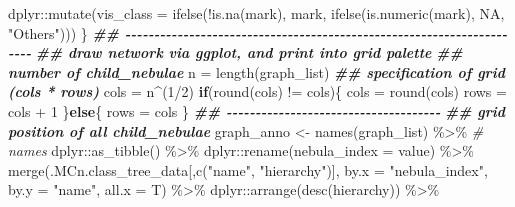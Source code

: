\documentclass[
]{article}
\newenvironment{Shaded}{\begin{snugshade}}{\end{snugshade}}
\newcommand{\AttributeTok}[1]{\textcolor[rgb]{0.77,0.63,0.00}{#1}}
\newcommand{\CommentTok}[1]{\textcolor[rgb]{0.56,0.35,0.01}{\textit{#1}}}
\newcommand{\ConstantTok}[1]{\textcolor[rgb]{0.00,0.00,0.00}{#1}}
\newcommand{\ControlFlowTok}[1]{\textcolor[rgb]{0.13,0.29,0.53}{\textbf{#1}}}
\newcommand{\DecValTok}[1]{\textcolor[rgb]{0.00,0.00,0.81}{#1}}
\newcommand{\DocumentationTok}[1]{\textcolor[rgb]{0.56,0.35,0.01}{\textbf{\textit{#1}}}}
\newcommand{\FunctionTok}[1]{\textcolor[rgb]{0.00,0.00,0.00}{#1}}
\newcommand{\NormalTok}[1]{#1}
\newcommand{\OtherTok}[1]{\textcolor[rgb]{0.56,0.35,0.01}{#1}}
\newcommand{\SpecialCharTok}[1]{\textcolor[rgb]{0.00,0.00,0.00}{#1}}
\newcommand{\StringTok}[1]{\textcolor[rgb]{0.31,0.60,0.02}{#1}}
\begin{document}
\begin{Shaded}
\begin{Highlighting}[]
\NormalTok{        dplyr}\SpecialCharTok{::}\FunctionTok{mutate}\NormalTok{(}\AttributeTok{vis\_class =} \FunctionTok{ifelse}\NormalTok{(}\SpecialCharTok{!}\FunctionTok{is.na}\NormalTok{(mark), mark,}
                                         \FunctionTok{ifelse}\NormalTok{(}\FunctionTok{is.numeric}\NormalTok{(mark), }\ConstantTok{NA}\NormalTok{, }\StringTok{"Others"}\NormalTok{)))}
\NormalTok{    \}}
    \DocumentationTok{\#\# {-}{-}{-}{-}{-}{-}{-}{-}{-}{-}{-}{-}{-}{-}{-}{-}{-}{-}{-}{-}{-}{-}{-}{-}{-}{-}{-}{-}{-}{-}{-}{-}{-}{-}{-}{-}{-}{-}{-}{-}{-}{-}{-}{-}{-}{-}{-}{-}{-}{-}{-}{-}{-}{-}{-}{-}{-}{-}{-}{-}{-}{-}{-}{-}{-}{-}{-}{-}{-}{-} }
    \DocumentationTok{\#\# draw network via ggplot, and print into grid palette}
    \DocumentationTok{\#\# number of child\_nebulae}
\NormalTok{    n }\OtherTok{=} \FunctionTok{length}\NormalTok{(graph\_list)}
    \DocumentationTok{\#\# specification of grid (cols * rows)}
\NormalTok{    cols }\OtherTok{=}\NormalTok{ n}\SpecialCharTok{\^{}}\NormalTok{(}\DecValTok{1}\SpecialCharTok{/}\DecValTok{2}\NormalTok{)}
    \ControlFlowTok{if}\NormalTok{(}\FunctionTok{round}\NormalTok{(cols) }\SpecialCharTok{!=}\NormalTok{ cols)\{}
\NormalTok{      cols }\OtherTok{=} \FunctionTok{round}\NormalTok{(cols)}
\NormalTok{      rows }\OtherTok{=}\NormalTok{ cols }\SpecialCharTok{+} \DecValTok{1}
\NormalTok{    \}}\ControlFlowTok{else}\NormalTok{\{}
\NormalTok{      rows }\OtherTok{=}\NormalTok{ cols}
\NormalTok{    \}}
    \DocumentationTok{\#\# {-}{-}{-}{-}{-}{-}{-}{-}{-}{-}{-}{-}{-}{-}{-}{-}{-}{-}{-}{-}{-}{-}{-}{-}{-}{-}{-}{-}{-}{-}{-}{-}{-}{-}{-}{-}{-} }
    \DocumentationTok{\#\# grid position of all child\_nebulae}
\NormalTok{    graph\_anno }\OtherTok{\textless{}{-}} \FunctionTok{names}\NormalTok{(graph\_list) }\SpecialCharTok{\%\textgreater{}\%} \CommentTok{\# names}
\NormalTok{      dplyr}\SpecialCharTok{::}\FunctionTok{as\_tibble}\NormalTok{() }\SpecialCharTok{\%\textgreater{}\%}
\NormalTok{      dplyr}\SpecialCharTok{::}\FunctionTok{rename}\NormalTok{(}\AttributeTok{nebula\_index =}\NormalTok{ value) }\SpecialCharTok{\%\textgreater{}\%}
      \FunctionTok{merge}\NormalTok{(.MCn.class\_tree\_data[,}\FunctionTok{c}\NormalTok{(}\StringTok{"name"}\NormalTok{, }\StringTok{"hierarchy"}\NormalTok{)], }\AttributeTok{by.x =} \StringTok{"nebula\_index"}\NormalTok{, }\AttributeTok{by.y =} \StringTok{"name"}\NormalTok{, }\AttributeTok{all.x =}\NormalTok{ T) }\SpecialCharTok{\%\textgreater{}\%}
\NormalTok{      dplyr}\SpecialCharTok{::}\FunctionTok{arrange}\NormalTok{(}\FunctionTok{desc}\NormalTok{(hierarchy)) }\SpecialCharTok{\%\textgreater{}\%}

\end{Highlighting}
\end{Shaded}
\end{document}
